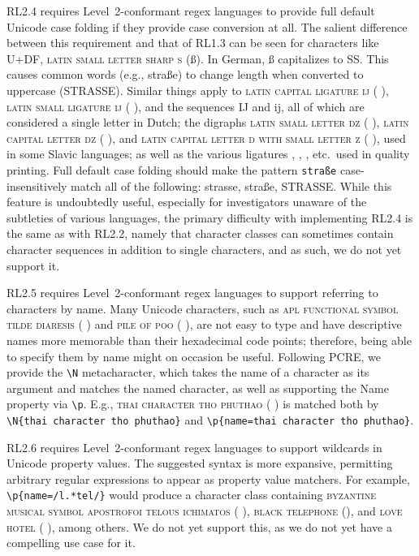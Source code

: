 \documentclass[5p,final,number,sort&compress]{elsarticle}
\newcommand{\re}[1]{\texttt{#1}}
\newcommand*{\whack}{\textbackslash}
\begin{document}
RL2.4 requires Level~2-conformant regex languages to provide full default Unicode case folding if they provide case conversion at all. The salient difference between this requirement and that of RL1.3 can be seen for characters like U+DF, \textsc{latin small letter sharp s} (ß). In German, ß capitalizes to SS. This causes common words (e.g., straße) to change length when converted to uppercase (STRASSE). Similar things apply to \textsc{latin capital ligature ij} (
), \textsc{latin small ligature ij} (
), and the sequences IJ and ij, all of which are considered a single letter in Dutch; the digraphs \textsc{latin small letter dz} (
), \textsc{latin capital letter dz} (
), and \textsc{latin capital letter d with small letter z} (
), used in some Slavic languages; as well as the various ligatures 
,
, 
, etc.\ used in quality printing. Full default case folding should make the pattern \re{straße} case-insensitively match all of the following: strasse, straße, STRASSE. While this feature is undoubtedly useful, especially for investigators unaware of the subtleties of various languages, the primary difficulty with implementing RL2.4 is the same as with RL2.2, namely that character classes can sometimes contain character sequences in addition to single characters, and as such, we do not yet support it.

RL2.5 requires Level~2-conformant regex languages to support referring to characters by name. Many Unicode characters, such as \textsc{apl functional symbol tilde diaresis} (
) and \textsc{pile of poo} ( ), are not easy to type and have descriptive names more memorable than their hexadecimal code points; therefore, being able to specify them by name might on occasion be useful. Following PCRE, we provide the \re{\whack N} metacharacter, which takes the name of a character as its argument and matches the named character, as well as supporting the Name property via \re{\whack p}. E.g., \textsc{thai character tho phuthao} (
) is matched both by \re{\whack N\{thai character tho phuthao\}} and \re{\whack p\{name=thai character tho phuthao\}}.

RL2.6 requires Level~2-conformant regex languages to support wildcards in Unicode property values. The suggested syntax is more expansive, permitting arbitrary regular expressions to appear as property value matchers. For example, \re{\whack p\{name=/l.*tel/\}} would produce a character class containing \textsc{byzantine musical symbol apostrofoi telous ichimatos} ( ), \textsc{black telephone} (), and \textsc{love hotel} ( ), among others. We do not yet support this, as we do not yet have a compelling use case for it.
\end{document}
